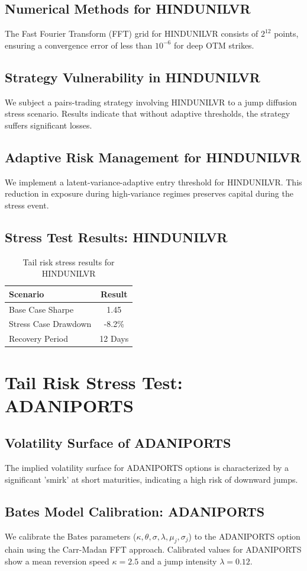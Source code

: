 \documentclass[12pt,a4paper,twoside]{article}
\begin{document}
\subsection{Numerical Methods for HINDUNILVR}
The Fast Fourier Transform (FFT) grid for HINDUNILVR consists of $2^{12}$ points, ensuring a convergence error of less than $10^{-6}$ for deep OTM strikes.
\subsection{Strategy Vulnerability in HINDUNILVR}
We subject a pairs-trading strategy involving HINDUNILVR to a jump diffusion stress scenario. Results indicate that without adaptive thresholds, the strategy suffers significant losses.
\subsection{Adaptive Risk Management for HINDUNILVR}
We implement a latent-variance-adaptive entry threshold for HINDUNILVR. This reduction in exposure during high-variance regimes preserves capital during the stress event.
\subsection{Stress Test Results: HINDUNILVR}
\begin{table}[H]
\centering
\begin{tabular}{|l|c|}
\hline
Scenario & Result \\
\hline
Base Case Sharpe & 1.45 \\
Stress Case Drawdown & -8.2\% \\
Recovery Period & 12 Days \\
\hline
\end{tabular}
\caption{Tail risk stress results for HINDUNILVR}
\end{table}
\newpage

\section{Tail Risk Stress Test: ADANIPORTS}
\subsection{Volatility Surface of ADANIPORTS}
The implied volatility surface for ADANIPORTS options is characterized by a significant 'smirk' at short maturities, indicating a high risk of downward jumps.
\subsection{Bates Model Calibration: ADANIPORTS}
We calibrate the Bates parameters ($\kappa, \theta, \sigma, \lambda, \mu_j, \sigma_j$) to the ADANIPORTS option chain using the Carr-Madan FFT approach.
Calibrated values for ADANIPORTS show a mean reversion speed $\kappa = 2.5$ and a jump intensity $\lambda = 0.12$.
\end{document}
